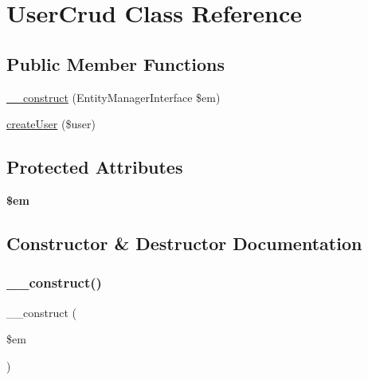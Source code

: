 \hypertarget{class_app_1_1_d_a_l_1_1_user_crud}{}\section{User\+Crud Class Reference}
\label{class_app_1_1_d_a_l_1_1_user_crud}
\subsection*{Public Member Functions}
\begin{DoxyCompactItemize}
\item 
\mbox{\hyperlink{class_app_1_1_d_a_l_1_1_user_crud_a25f4258aeb5ce2a61a2504cb7c058485}{\+\_\+\+\_\+construct}} (Entity\+Manager\+Interface \$em)
\item 
\mbox{\hyperlink{class_app_1_1_d_a_l_1_1_user_crud_a77fe896cc650f09c39927b9533ca8a0c}{create\+User}} (\$user)
\end{DoxyCompactItemize}
\subsection*{Protected Attributes}
\begin{DoxyCompactItemize}
\item 
\mbox{\label{class_app_1_1_d_a_l_1_1_user_crud_a0f2991d5fed029ef50ef619f1a532d06}} 
{\bfseries \$em}
\end{DoxyCompactItemize}


\subsection{Constructor \& Destructor Documentation}
\mbox{\label{class_app_1_1_d_a_l_1_1_user_crud_a25f4258aeb5ce2a61a2504cb7c058485}} 
\subsubsection{\texorpdfstring{\_\_construct()}{\_\_construct()}}
{\footnotesize\ttfamily \+\_\+\+\_\+construct (\begin{DoxyParamCaption}\item[{Entity\+Manager\+Interface}]{\$em }\end{DoxyParamCaption})}

